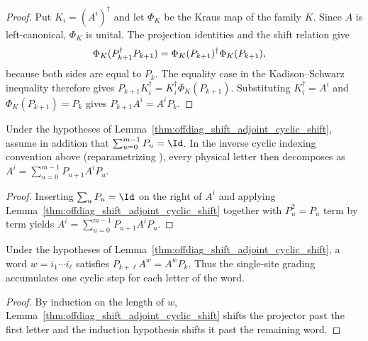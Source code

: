 \begin{proof}\leanok
    Put $K_i=(A^i)^\dagger$ and let $\Phi_K$ be the Kraus map of the family
    $K$. Since $A$ is left-canonical, $\Phi_K$ is unital. The projection
    identities and the shift relation give
    \begin{align}
        \Phi_K(P_{k+1}^\dagger P_{k+1})
         & =
        \Phi_K(P_{k+1})^\dagger\Phi_K(P_{k+1}),
        \notag
    \end{align}
    because both sides are equal to $P_k$. The equality case in the
    Kadison--Schwarz inequality therefore gives
    $P_{k+1}K_i^\dagger=K_i^\dagger\Phi_K(P_{k+1})$. Substituting
    $K_i^\dagger=A^i$ and $\Phi_K(P_{k+1})=P_k$ gives
    $P_{k+1}A^i=A^iP_k$.
\end{proof}

\begin{lemma}
    \label{thm:eq_sum_offdiag_adjoint_cyclic_shift}
    \leanok
    Under the hypotheses of Lemma~\ref{thm:offdiag_shift_adjoint_cyclic_shift},
    assume in addition that $\sum_{u=0}^{m-1} P_u=\Id$. In the inverse
    cyclic indexing convention above (reparametrizing
    \cite[eq.~Aoffdiag]{DeLasCuevas2017Irreducible}), every physical letter
    then decomposes as $A^i=\sum_{u=0}^{m-1}P_{u+1}A^iP_u$.
\end{lemma}

\begin{proof}\leanok
    Inserting $\sum_u P_u=\Id$ on the right of $A^i$ and applying
    Lemma~\ref{thm:offdiag_shift_adjoint_cyclic_shift} together with
    $P_u^2=P_u$ term by term yields $A^i=\sum_{u=0}^{m-1}P_{u+1}A^iP_u$.
\end{proof}

\begin{lemma}
    \label{thm:offdiag_shift_eval_word_adjoint_cyclic_shift}
    \leanok
    Under the hypotheses of Lemma~\ref{thm:offdiag_shift_adjoint_cyclic_shift},
    a word $w=i_1\cdots i_\ell$ satisfies $P_{k+\ell} A^w=A^w P_k$.
    Thus the single-site grading accumulates one cyclic step for each letter of
    the word.
\end{lemma}

\begin{proof}\leanok
    By induction on the length of $w$,
    Lemma~\ref{thm:offdiag_shift_adjoint_cyclic_shift} shifts the projector
    past the first letter and the induction hypothesis shifts it past the
    remaining word.
\end{proof}


